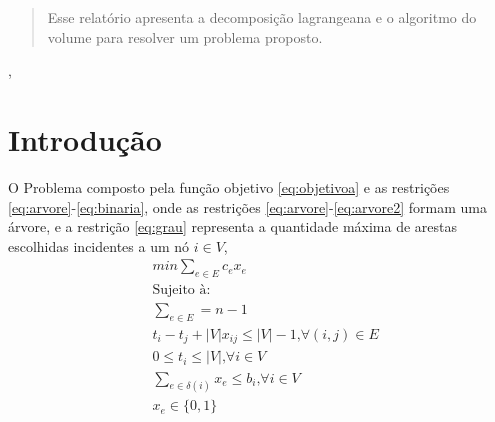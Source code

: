 \documentclass{proc}
\begin{document}

\author{João C. Abreu}



\begin{abstract}
Esse relatório apresenta a decomposição lagrangeana e o algoritmo do volume para resolver um problema proposto.

\end{abstract}

\begin{keywords}
, 
\end{keywords}

\doublespacing

\section{Introdução}
\label{sec:intro}
O Problema composto pela função objetivo \eqref{eq:objetivoa} e as restrições \eqref{eq:arvore}-\eqref{eq:binaria},
onde as restrições \eqref{eq:arvore}-\eqref{eq:arvore2} formam uma árvore, e a restrição \eqref{eq:grau} representa
a quantidade máxima de arestas escolhidas incidentes a um nó $i \in V$,
\begin{align}
    & min \sum_{e \in E} c_ex_e \label{eq:objetivoa} \\
    & \text{Sujeito à:} \nonumber \\
    & \sum_{e \in E} =  n - 1 \label{eq:arvore} \\
    & t_i - t_j + |V|x_{ij} \le |V| - 1 \textrm{,} \forall (i,j) \in E \label{eq:arvore1} \\
    & 0 \le t_i \le |V| \textrm{,} \forall i \in V \label{eq:arvore2} \\
    & \sum_{e \in \delta(i)} x_e \le b_i \textrm{,} \forall i \in V \label{eq:grau} \\
    & x_e \in \{0, 1\} \label{eq:binaria}
\end{align}
\end{document}
